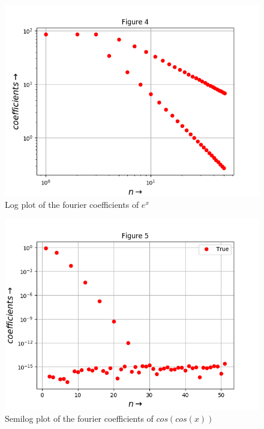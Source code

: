 \documentclass[11pt, a4paper]{article}
\begin{document}
	\begin{figure}[!tbh]
   	\centering
   	\includegraphics[scale=0.6]{Figure_4.png}   
   	\caption{Log plot of the fourier coefficients of $e^{x}$}
   	\label{fig:sample}
   \end{figure} 
   
	\begin{figure}[!tbh]
   	\centering
   	\includegraphics[scale=0.6]{Figure_5.png}   
   	\caption{Semilog plot of the fourier coefficients of $cos(cos(x))$}
   	\label{fig:sample}
   \end{figure} 
\end{document}
